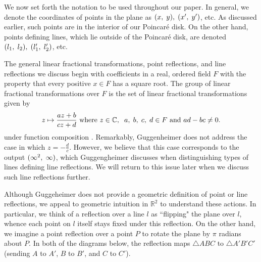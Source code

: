 \documentclass[12pt]{article}
\newcommand{\R}{\mathbb{R}}
\newcommand{\C}{\mathbb{C}}
\newcommand{\ttc}{, \hspace{1mm}}
\newcommand{\poincare}{Poincar\'{e} }
\newcommand{\specialend}{(\infty^2\ttc\infty)}
\theoremstyle{plain}
\theoremstyle{definition}
\begin{document}
\hspace{10mm} We now set forth the notation to be used throughout our paper. In general, we denote the coordinates of points in the plane as $(x \ttc y) \ttc (x' \ttc y')$, etc. As discussed earlier, such points are in the interior of our \poincare disk. On the other hand, points defining lines, which lie outside of the \poincare disk, are denoted $(l_1 \ttc l_2) \ttc (l_1' \ttc l_2')$, etc. 

The general linear fractional transformations, point reflections, and line reflections we discuss begin with coefficients in a real, ordered field $F$ with the property that every positive $x \in F$ has a square root. The group of linear fractional transformations over $F$ is the set of linear fractional transformations given by
\begin{equation} 
	z \mapsto \frac{az+b}{cz+d} \text{ where } z \in \C, \hspace{2mm} a \ttc b \ttc c \ttc d \in F \text{ and } ad-bc \neq 0. 
\end{equation}
under function composition \cite{shuman_lfts}. Remarkably, Guggenheimer does not address the case in which $z = -\frac{d}{c}$. However, we believe that this case corresponds to the output $\specialend$, which Guggengheimer discusses when distinguishing types of lines defining line reflections. We will return to this issue later when we discuss such line reflections further. 

Although Guggeheimer does not provide a geometric definition of point or line reflections, we appeal to geometric intuition in $\R^2$ to understand these actions. In particular, we think of a reflection over a line $l$ as ``flipping" the plane over $l$, whence each point on $l$ itself stays fixed under this reflection. On the other hand, we imagine a point reflection over a point $P$ to rotate the plane by $\pi$ radians about $P$. In both of the diagrams below, the reflection maps $\triangle ABC$ to $\triangle A'B'C'$ (sending $A$ to $A'$, $B$ to $B'$, and $C$ to $C'$). 
\end{document}
